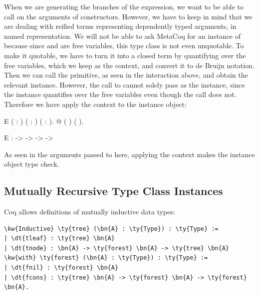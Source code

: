 When we are generating the branches of the  expression, we want to be able to call \graphpredicate{} on the arguments of constructors. However, we have to keep in mind that we are dealing with reified terms representing dependently typed arguments, in named representation. We will not be able to ask MetaCoq for an instance of  because since  and  are free variables, this type class is not even unquotable. To make it quotable, we have to turn it into a closed term by quantifying over the free variables, which we keep as the context, and convert it to de Bruijn notation. Then we can call the  \gls{primitive}, as seen in the interaction above, and obtain the relevant \GraphPredicate{} instance. However, the call to \graphpredicate{} cannot solely pass \GraphPredicatevec{} as the instance, since the instance quantifies over the free variables even though the \graphpredicate{} call does not. Therefore we have apply the context to the instance object:

\vspace{.2in}
\begin{SaveVerbatim}{E}
 ( : )
         ( : \GraphPredicate{} )
         ( : ).
 @\graphpredicate{} (\Vec{}  ) (   ).
\end{SaveVerbatim}

\begin{SaveVerbatim}{E}
\graphpredicate{}
     :  ->  ->    ->  -> 
\end{SaveVerbatim}

As seen in the arguments passed to \GraphPredicatevec{} here, applying the context makes the instance object type check.

\newpage
\subsection{Mutually Recursive Type Class Instances}

Coq allows definitions of mutually inductive data types:

\begin{Verbatim}
\kw{Inductive} \ty{tree} (\bn{A} : \ty{Type}) : \ty{Type} :=
| \dt{tleaf} : \ty{tree} \bn{A}
| \dt{tnode} : \bn{A} -> \ty{forest} \bn{A} -> \ty{tree} \bn{A}
\kw{with} \ty{forest} (\bn{A} : \ty{Type}) : \ty{Type} :=
| \dt{fnil} : \ty{forest} \bn{A}
| \dt{fcons} : \ty{tree} \bn{A} -> \ty{forest} \bn{A} -> \ty{forest} \bn{A}.
\end{Verbatim}

